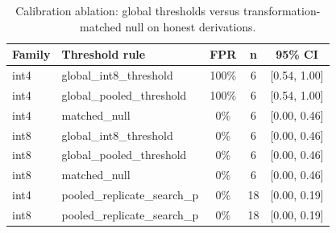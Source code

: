 \begin{table}[t]
\centering
\caption{Calibration ablation: global thresholds versus transformation-matched null on honest derivations.}
\label{tab:calibration}
\footnotesize
\begin{tabular}{llccc}
\toprule
Family & Threshold rule & FPR & n & 95\% CI \\
\midrule
int4 & global\_int8\_threshold & 100\% & 6 & [0.54, 1.00] \\
int4 & global\_pooled\_threshold & 100\% & 6 & [0.54, 1.00] \\
int4 & matched\_null & 0\% & 6 & [0.00, 0.46] \\
int8 & global\_int8\_threshold & 0\% & 6 & [0.00, 0.46] \\
int8 & global\_pooled\_threshold & 0\% & 6 & [0.00, 0.46] \\
int8 & matched\_null & 0\% & 6 & [0.00, 0.46] \\
int4 & pooled\_replicate\_search\_p & 0\% & 18 & [0.00, 0.19] \\
int8 & pooled\_replicate\_search\_p & 0\% & 18 & [0.00, 0.19] \\
\bottomrule
\end{tabular}
\end{table}